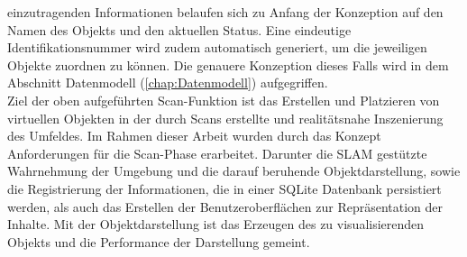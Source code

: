 einzutragenden Informationen belaufen sich zu Anfang der %
Konzeption auf den Namen des Objekts %
und den aktuellen Status. %
Eine eindeutige Identifikationsnummer wird zudem automatisch generiert, um die jeweiligen Objekte zuordnen zu können. 
Die genauere Konzeption dieses Falls wird in dem Abschnitt Datenmodell (\ref{chap:Datenmodell}) aufgegriffen. 
\\ 
Ziel der oben aufgeführten Scan-Funktion ist das Erstellen und Platzieren von virtuellen Objekten in der durch Scans erstellte und 
realitätsnahe Inszenierung des Umfeldes. Im Rahmen dieser Arbeit wurden durch das Konzept Anforderungen für die Scan-Phase erarbeitet. 
Darunter die \acs{SLAM} gestützte Wahrnehmung der Umgebung und die darauf beruhende Objektdarstellung, sowie die Registrierung der Informationen, die in 
einer SQLite Datenbank persistiert werden, als auch das Erstellen der Benutzeroberflächen zur Repräsentation der Inhalte. Mit der Objektdarstellung 
ist das Erzeugen des zu visualisierenden Objekts und die Performance der Darstellung gemeint. %

